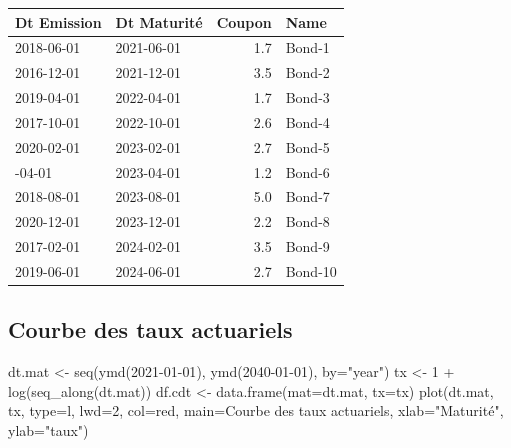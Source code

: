 \documentclass[
]{article}
\newenvironment{Shaded}{\begin{snugshade}}{\end{snugshade}}
\newcommand{\AttributeTok}[1]{\textcolor[rgb]{0.77,0.63,0.00}{#1}}
\newcommand{\DecValTok}[1]{\textcolor[rgb]{0.00,0.00,0.81}{#1}}
\newcommand{\FunctionTok}[1]{\textcolor[rgb]{0.00,0.00,0.00}{#1}}
\newcommand{\NormalTok}[1]{#1}
\newcommand{\OtherTok}[1]{\textcolor[rgb]{0.56,0.35,0.01}{#1}}
\newcommand{\SpecialCharTok}[1]{\textcolor[rgb]{0.00,0.00,0.00}{#1}}
\newcommand{\StringTok}[1]{\textcolor[rgb]{0.31,0.60,0.02}{#1}}
\begin{document}
\begin{table}[H]
\centering
\begin{tabular}{llrl}
\toprule
Dt Emission & Dt Maturité & Coupon & Name\\
\midrule
2018-06-01 & 2021-06-01 & 1.7 & Bond-1\\
2016-12-01 & 2021-12-01 & 3.5 & Bond-2\\
2019-04-01 & 2022-04-01 & 1.7 & Bond-3\\
2017-10-01 & 2022-10-01 & 2.6 & Bond-4\\
2020-02-01 & 2023-02-01 & 2.7 & Bond-5\\
\addlinespace
2016-04-01 & 2023-04-01 & 1.2 & Bond-6\\
2018-08-01 & 2023-08-01 & 5.0 & Bond-7\\
2020-12-01 & 2023-12-01 & 2.2 & Bond-8\\
2017-02-01 & 2024-02-01 & 3.5 & Bond-9\\
2019-06-01 & 2024-06-01 & 2.7 & Bond-10\\
\bottomrule
\end{tabular}
\end{table}

\hypertarget{courbe-des-taux-actuariels}{%
\subsection{Courbe des taux
actuariels}\label{courbe-des-taux-actuariels}}

\begin{Shaded}
\begin{Highlighting}[]
\NormalTok{dt.mat }\OtherTok{\textless{}{-}} \FunctionTok{seq}\NormalTok{(}\FunctionTok{ymd}\NormalTok{(}\StringTok{\textquotesingle{}2021{-}01{-}01\textquotesingle{}}\NormalTok{), }\FunctionTok{ymd}\NormalTok{(}\StringTok{\textquotesingle{}2040{-}01{-}01\textquotesingle{}}\NormalTok{), }\AttributeTok{by=}\StringTok{"year"}\NormalTok{)}
\NormalTok{tx }\OtherTok{\textless{}{-}} \DecValTok{1} \SpecialCharTok{+} \FunctionTok{log}\NormalTok{(}\FunctionTok{seq\_along}\NormalTok{(dt.mat))}
\NormalTok{df.cdt }\OtherTok{\textless{}{-}} \FunctionTok{data.frame}\NormalTok{(}\AttributeTok{mat=}\NormalTok{dt.mat, }\AttributeTok{tx=}\NormalTok{tx)}
\FunctionTok{plot}\NormalTok{(dt.mat, tx, }\AttributeTok{type=}\StringTok{\textquotesingle{}l\textquotesingle{}}\NormalTok{, }\AttributeTok{lwd=}\DecValTok{2}\NormalTok{, }\AttributeTok{col=}\StringTok{\textquotesingle{}red\textquotesingle{}}\NormalTok{, }
     \AttributeTok{main=}\StringTok{\textquotesingle{}Courbe des taux actuariels\textquotesingle{}}\NormalTok{,}
     \AttributeTok{xlab=}\StringTok{"Maturité"}\NormalTok{, }\AttributeTok{ylab=}\StringTok{"taux"}\NormalTok{)}
\end{Highlighting}
\end{Shaded}
\end{document}
